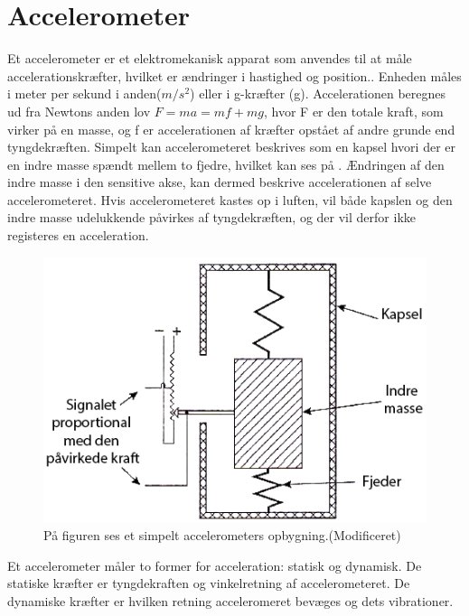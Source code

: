 \section{Accelerometer}
Et accelerometer er et elektromekanisk apparat som anvendes til at måle accelerationskræfter, hvilket er ændringer i hastighed og position.\citep{Goodrich2013,TittertonWeston2004}. Enheden måles i meter per sekund i anden($m/s^2$) eller i g-kræfter (g).\citep{Sparkfun,TittertonWeston2004}
Accelerationen beregnes ud fra Newtons anden lov $F=ma=mf+mg$, hvor F er den totale kraft, som virker på en masse, og f er accelerationen af kræfter opstået af andre grunde end tyngdekræften.\citep{TittertonWeston2004} \newline
Simpelt kan accelerometeret beskrives som en kapsel hvori der er en indre masse spændt mellem to fjedre, hvilket kan ses på . Ændringen af den indre masse i den sensitive akse, kan dermed beskrive accelerationen af selve accelerometeret. Hvis accelerometeret kastes op i luften, vil både kapslen og den indre masse udelukkende påvirkes af tyngdekræften, og der vil derfor ikke registeres en acceleration.\citep{TittertonWeston2004} \newline

\begin{figure}[H]
	\centering
	\includegraphics[scale=0.25]{figures/bProblemloesning/accelerometer_basic.png}
	\caption{På figuren ses et simpelt accelerometers opbygning.\citep{TittertonWeston2004}(Modificeret)}
	\label{acc_simpelt}
\end{figure}

Et accelerometer måler to former for acceleration: statisk og dynamisk. De statiske kræfter er tyngdekraften og  vinkelretning af accelerometeret. De dynamiske kræfter er hvilken retning acceleromeret bevæges og dets vibrationer. \citep{Sparkfun,Engineering, Goodrich2013}

